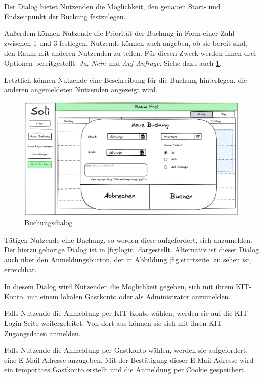 Der Dialog bietet Nutzenden die Möglichkeit, den genauen Start- und Endzeitpunkt der Buchung festzulegen.

Außerdem können Nutzende die Priorität der Buchung in Form einer Zahl zwischen 1 und 3 festlegen.
Nutzende können auch angeben, ob sie bereit sind, den Raum mit anderen Nutzenden zu teilen.
Für diesen Zweck werden ihnen drei Optionen bereitgestellt: \textit{Ja}, \textit{Nein} und \textit{Auf Anfrage}.
Siehe dazu auch \ref{fig:buchung}.

Letztlich können Nutzende eine Beschreibung für die Buchung hinterlegen, die anderen angemeldeten Nutzenden angezeigt wird.
\clearpage
\begin{figure}[ht]
    \centering
    \includegraphics[scale=0.15]{figures/ui/buchungsdialog}
    \caption{Buchungsdialog}
    \label{fig:buchung}
\end{figure}
\clearpage

Tätigen Nutzende eine Buchung, so werden diese aufgefordert, sich anzumelden.
Der hierzu gehörige Dialog ist in \ref{fig:login} dargestellt.
Alternativ ist dieser Dialog auch über den Anmeldungsbutton, der in Abbildung \ref{fig:startseite} zu sehen ist, erreichbar.

In diesem Dialog wird Nutzenden die Möglichkeit gegeben, sich mit ihrem KIT-Konto, mit einem lokalen Gastkonto oder als Administrator anzumelden.

Falls Nutzende die Anmeldung per KIT-Konto wählen, werden sie auf die KIT-Login-Seite weitergeleitet.
Von dort aus können sie sich mit ihren KIT-Zugangsdaten anmelden.

Falls Nutzende die Anmeldung per Gastkonto wählen, werden sie aufgefordert, eine E-Mail-Adresse anzugeben.
Mit der Bestätigung dieser E-Mail-Adresse wird ein temporäres Gastkonto erstellt und die Anmeldung per Cookie gespeichert.

